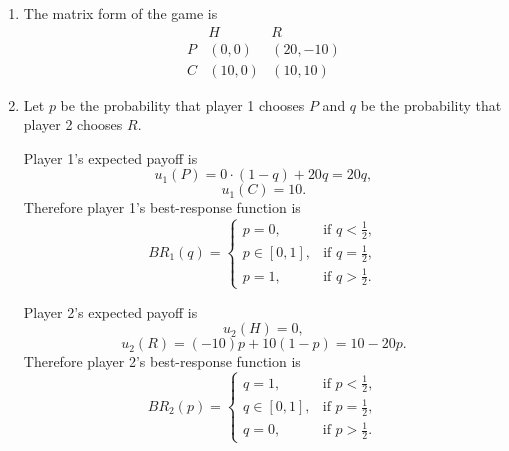 \documentclass[12pt,a4paper]{article}
\begin{document}
\begin{enumerate}[label=\alph*.]
  \item The matrix form of the game is
  \[
  \begin{array}{c|cc}
   & H & R\\
  \hline
  P & (0,0) & (20,-10)\\
  C & (10,0) & (10,10)
  \end{array}
  \]

  \item Let \(p\) be the probability that player 1 chooses \(P\) and \(q\) be the probability that player 2 chooses \(R\). 
  
  Player 1's expected payoff is
  \[
    u_1(P)=0\cdot(1-q)+20q=20q,
  \]
  \[
    u_1(C)=10.
  \]
  Therefore player 1's best-response function is
  \[
    BR_1(q)=
    \begin{cases}
      p=0, & \text{if }q<\frac12,\\[4pt]
      p\in[0,1], & \text{if }q=\frac12,\\[4pt]
      p=1, & \text{if }q>\frac12.
    \end{cases}
  \]

  Player 2's expected payoff is
  \[
    u_2(H)=0,
  \]
  \[
    u_2(R)=(-10)p+10(1-p)=10-20p.
  \]
  Therefore player 2's best-response function is
  \[
    BR_2(p)=
    \begin{cases}
      q=1, & \text{if }p<\frac12,\\[4pt]
      q\in[0,1], & \text{if }p=\frac12,\\[4pt]
      q=0, & \text{if }p>\frac12.
    \end{cases}
  \]

  \begin{center}
\end{center}
\end{enumerate}
\end{document}
